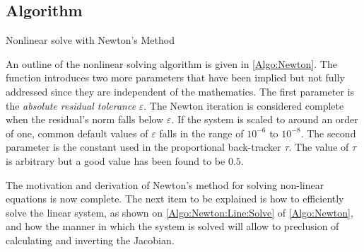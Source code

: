 \documentclass[12pt]{UWMadThesis}
\begin{document}
\subsection{Algorithm}

\begin{algorithm}[t]
    \caption{Nonlinear solve with Newton's Method}
    \label{Algo:Newton}
\end{algorithm}

An outline of the nonlinear solving algorithm is given in \cref{Algo:Newton}.
The function introduces two more parameters that have been implied but not fully addressed since they are independent of the mathematics.
The first parameter is the \textit{absolute residual tolerance} $\varepsilon$.
The Newton iteration is considered complete when the residual's norm falls below $\varepsilon$.
If the system is scaled to around an order of one, common default values of $\varepsilon$ falls in the range of $10^{-6}$ to $10^{-8}$.
The second parameter is the constant used in the proportional back-tracker $\tau$.
The value of $\tau$ is arbitrary but a good value has been found to be $0.5$.

The motivation and derivation of Newton's method for solving non-linear equations is now complete.
The next item to be explained is how to efficiently solve the linear system, as shown on \cref{Algo:Newton:Line:Solve} of \cref{Algo:Newton}, and how the manner in which the system is solved will allow to preclusion of calculating and inverting the Jacobian.
\end{document}
